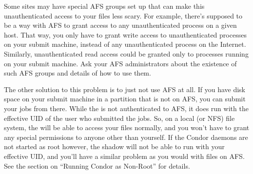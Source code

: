 Some sites may have special AFS groups set up that can make this
unauthenticated access to your files less scary.  For example, there's
supposed to be a way with AFS to grant access to any unauthenticated
process on a given host.  That way, you only have to grant write
access to unauthenticated processes on your submit machine, instead of
any unauthenticated process on the Internet.  Similarly,
unauthenticated read access could be granted only to processes running
on your submit machine.  Ask your AFS administrators about the existence
of such AFS groups and details of how to use them.

The other solution to this problem is to just not use AFS at all.  If
you have disk space on your submit machine in a partition that is not
on AFS, you can submit your jobs from there.  While the 
is not authenticated to AFS, it does run with the effective UID of the
user who submitted the jobs.  So, on a local (or NFS) file system, the
 will be able to access your files normally, and you
won't have to grant any special permissions to anyone other than
yourself.  If the Condor daemons are not started as root however, the
shadow will not be able to run with your effective UID, and you'll
have a similar problem as you would with files on AFS.  See the
section on ``Running Condor as Non-Root'' for details.
    

